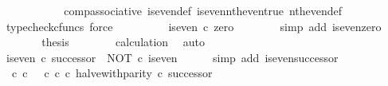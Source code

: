\begin{isabellebody}
\ {\isachardoublequoteopen}{\isachardot}{\kern0pt}{\isachardot}{\kern0pt}{\isachardot}{\kern0pt}\ {\isacharequal}{\kern0pt}\ {\isasymt}{\isachardoublequoteclose}\isanewline
\ \ \ \ \ \ \isamarkupfalse%
\ comp{\isacharunderscore}{\kern0pt}associative{}\ is{\isacharunderscore}{\kern0pt}even{\isacharunderscore}{\kern0pt}def{}\ is{\isacharunderscore}{\kern0pt}even{\isacharunderscore}{\kern0pt}nth{\isacharunderscore}{\kern0pt}even{\isacharunderscore}{\kern0pt}true\ nth{\isacharunderscore}{\kern0pt}even{\isacharunderscore}{\kern0pt}def{}\ \isamarkupfalse%
\ {\isacharparenleft}{\kern0pt}typecheck{\isacharunderscore}{\kern0pt}cfuncs{\isacharcomma}{\kern0pt}\ force{\isacharparenright}{\kern0pt}\isanewline
\ \ \ \ \isamarkupfalse%
\ \isamarkupfalse%
\ {\isachardoublequoteopen}{\isachardot}{\kern0pt}{\isachardot}{\kern0pt}{\isachardot}{\kern0pt}\ {\isacharequal}{\kern0pt}\ is{\isacharunderscore}{\kern0pt}even\ {\isasymcirc}\isactrlsub c\ zero{\isachardoublequoteclose}\isanewline
\ \ \ \ \ \ \isamarkupfalse%
\ {\isacharparenleft}{\kern0pt}simp\ add{\isacharcolon}{\kern0pt}\ is{\isacharunderscore}{\kern0pt}even{\isacharunderscore}{\kern0pt}zero{\isacharparenright}{\kern0pt}\isanewline
\ \ \ \ \isamarkupfalse%
\ \isamarkupfalse%
\ {\isacharquery}{\kern0pt}thesis\isanewline
\ \ \ \ \ \ \isamarkupfalse%
\ calculation\ \isamarkupfalse%
\ auto\isanewline
\ \ \isamarkupfalse%
\isanewline
\isanewline
\ \ \isamarkupfalse%
\ {\isachardoublequoteopen}is{\isacharunderscore}{\kern0pt}even\ {\isasymcirc}\isactrlsub c\ successor\ {\isacharequal}{\kern0pt}\ NOT\ {\isasymcirc}\isactrlsub c\ is{\isacharunderscore}{\kern0pt}even{\isachardoublequoteclose}\isanewline
\ \ \ \ \isamarkupfalse%
\ {\isacharparenleft}{\kern0pt}simp\ add{\isacharcolon}{\kern0pt}\ is{\isacharunderscore}{\kern0pt}even{\isacharunderscore}{\kern0pt}successor{\isacharparenright}{\kern0pt}\isanewline
\isanewline
\ \ \isamarkupfalse%
\ {\isachardoublequoteopen}{\isacharparenleft}{\kern0pt}{\isacharparenleft}{\kern0pt}{\isasymt}\ {\isasymcirc}\isactrlsub c\ {\isasymbeta}\isactrlbsub {\isasymnat}\isactrlsub c\isactrlesub {\isacharparenright}{\kern0pt}\ {\isasymamalg}\ {\isacharparenleft}{\kern0pt}{\isasymf}\ {\isasymcirc}\isactrlsub c\ {\isasymbeta}\isactrlbsub {\isasymnat}\isactrlsub c\isactrlesub {\isacharparenright}{\kern0pt}\ {\isasymcirc}\isactrlsub c\ halve{\isacharunderscore}{\kern0pt}with{\isacharunderscore}{\kern0pt}parity{\isacharparenright}{\kern0pt}\ {\isasymcirc}\isactrlsub c\ successor\ {\isacharequal}{\kern0pt}\isanewline

\end{isabellebody}
